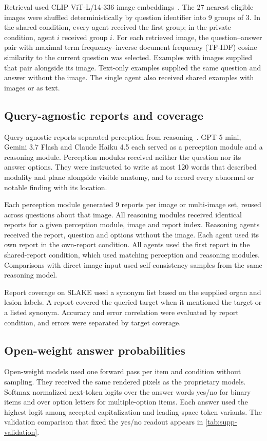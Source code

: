 Retrieval used CLIP ViT-L/14-336 image embeddings~\cite{radford2021clip}. The 27 nearest eligible images were shuffled deterministically by question identifier into 9 groups of 3. In the shared condition, every agent received the first group; in the private condition, agent $i$ received group $i$. For each retrieved image, the question--answer pair with maximal term frequency--inverse document frequency (TF-IDF) cosine similarity to the current question was selected. Examples with images supplied that pair alongside its image. Text-only examples supplied the same question and answer without the image. The single agent also received shared examples with images or as text.

\subsection{Query-agnostic reports and coverage}
Query-agnostic reports separated perception from reasoning~\cite{qiao2024prism}. GPT-5 mini, Gemini 3.7 Flash and Claude Haiku 4.5 each served as a perception module and a reasoning module. Perception modules received neither the question nor its answer options. They were instructed to write at most 120 words that described modality and plane alongside visible anatomy, and to record every abnormal or notable finding with its location.

Each perception module generated 9 reports per image or multi-image set, reused across questions about that image. All reasoning modules received identical reports for a given perception module, image and report index. Reasoning agents received the report, question and options without the image. Each agent used its own report in the own-report condition. All agents used the first report in the shared-report condition, which used matching perception and reasoning modules. Comparisons with direct image input used self-consistency samples from the same reasoning model.

Report coverage on SLAKE used a synonym list based on the supplied organ and lesion labels. A report covered the queried target when it mentioned the target or a listed synonym. Accuracy and error correlation were evaluated by report condition, and errors were separated by target coverage.

\subsection{Open-weight answer probabilities}
Open-weight models used one forward pass per item and condition without sampling. They received the same rendered pixels as the proprietary models. Softmax normalized next-token logits over the answer words yes/no for binary items and over option letters for multiple-option items. Each answer used the highest logit among accepted capitalization and leading-space token variants. The validation comparison that fixed the yes/no readout appears in \cref{tab:supp-validation}.

